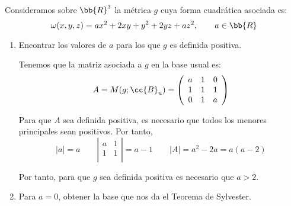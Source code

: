 \documentclass[12pt]{article}
\begin{document}
    \begin{ejercicio}
    Consideramos sobre $\bb{R}^3$ la métrica $g$ cuya forma cuadrática asociada es:
    \begin{equation*}
        \omega(x,y,z) = ax^2 + 2xy + y^2 + 2yz + az^2,\qquad a\in \bb{R}
    \end{equation*}

    \begin{enumerate}
        \item Encontrar los valores de $a$ para los que $g$ es definida positiva.

        Tenemos que la matriz asociada a $g$ en la base usual es:
        \begin{equation*}
            A = M(g;\cc{B}_u) = \left(\begin{array}{ccc}
                a & 1 & 0\\
                1 & 1 & 1\\
                0 & 1 & a
            \end{array}\right)
        \end{equation*}

        Para que $A$ sea definida positiva, es necesario que todos los menores principales sean positivos. Por tanto,
        \begin{equation*}
            |a|=a \qquad
            \left|\begin{array}{cc}
                a & 1\\
                1 & 1\\
            \end{array}\right| = a-1 \qquad
            |A| = a^2-2a = a(a-2)
        \end{equation*}

        Por tanto, para que $g$ sea definida positiva es necesario que $a>2$.

        \item Para $a=0$, obtener la base que nos da el Teorema de Sylvester.


\end{enumerate}
\end{ejercicio}
\end{document}
